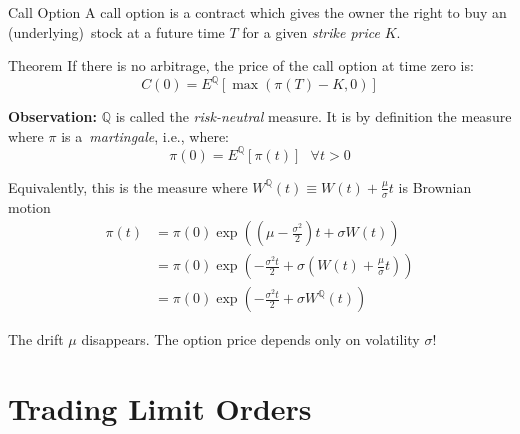 \documentclass{beamer}
\begin{document}
\begin{frame}[shrink=38]{{\color{cyan}{\large Option Pricing in a Liquid Market: the Black-Scholes Formula}}}
\bigskip
\begin{block}{Call Option}
A call option is a contract which gives the owner the right to buy an (underlying)\ stock at a future time $T$ for a given \textit{strike price} $K$.
\end{block}

\begin{block}{Theorem}
If there is no arbitrage, the price of the call option at time zero is:
\vspace{-8pt}
\begin{equation*}
C(0)=E^{\mathbb{Q}}[\max (\pi (T)-K,0)]
\end{equation*}
\end{block}

{\color{magenta}\textbf{Observation:}} $\mathbb{Q}$ is called the \textit{risk-neutral} measure. It is by definition the measure where $\pi $ is a\textit{\ martingale}, i.e., where:
\vspace{-5pt}
\begin{equation*}
\pi (0)=E^{\mathbb{Q}}[\pi (t)]\text{ \ \ \ }\forall t>0
\end{equation*}

Equivalently, this is the measure where $W^{\mathbb{Q}}(t)\equiv W(t)+\frac{\mu }{\sigma }t$ is Brownian motion
\vspace{-5pt}
\begin{align*}
\pi (t) &=\pi (0)\exp \left( \left(\mu -\frac{\sigma ^{2}}{2} \right)t+\sigma W(t) \right) \\
	&=\pi (0)\exp \left(-\frac{\sigma ^{2}t}{2}+\sigma \left( W(t)+\frac{\mu }{\sigma }t \right) \right)\\
	&=\pi (0)\exp \left(-\frac{\sigma ^{2}t}{2}+\sigma W^{\mathbb{Q}}(t) \right)
\end{align*}

The drift $\mu $ disappears. The option price depends only on volatility $\sigma$!

\end{frame}

\section{Trading Limit Orders}
\end{document}

